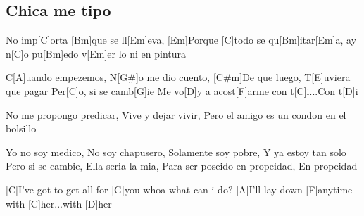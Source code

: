 \subsection*{Chica me tipo   }
\begin{guitar}
[Em]No imp[C]orta [Bm]que se ll[Em]eva,
[Em]Porque [C]todo se qu[Bm]itar[Em]a,
ay n[C]o pu[Bm]edo v[Em]er lo 
ni en pintura 



C[A]uando empezemos, N[G#]o me dio cuento,
[C#m]De que luego, T[E]uviera que pagar
Per[C]o, si se camb[G]ie 
Me vo[D]y a acost[F]arme con t[C]i...Con t[D]i



No me propongo predicar,
Vive y dejar vivir,
Pero el amigo es un condon en el bolsillo



Yo no soy medico, No soy chapusero,
Solamente soy pobre, Y ya estoy tan solo
Pero si se cambie, Ella seria la mia,
Para ser poseido en propeidad,  En propeidad



[C]I've got to get all for [G]you
whoa what can i do?
[A]I'll lay down [F]anytime with [C]her...with [D]her
\end{guitar}
